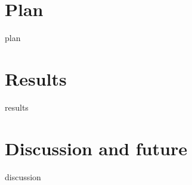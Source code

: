 \documentclass[12pt,a4paper]{article}
\begin{document}
\section{Plan}
	{plan}
\section{Results}
	{results}
\section{Discussion and future}
	{discussion}
\end{document}
